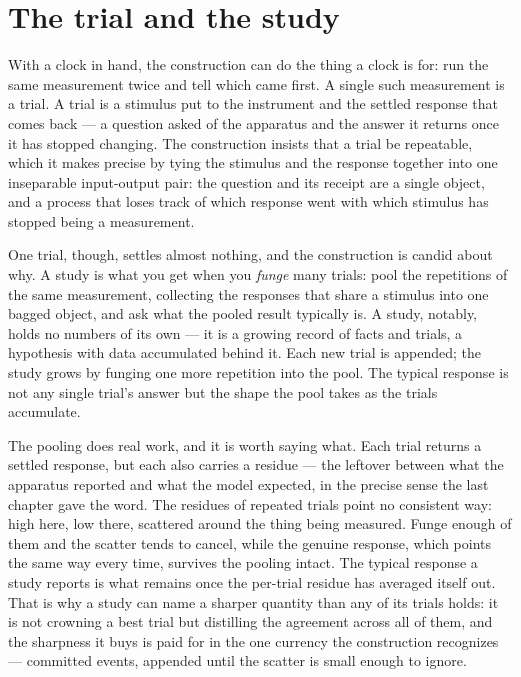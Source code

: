 \section{The trial and the study}
\label{se:the-trial-and-the-study}

With a clock in hand, the construction can do the thing a clock is for: run the same measurement twice
and tell which came first. A single such measurement is a trial. A trial is a stimulus put to the
instrument and the settled response that comes back --- a question asked of the apparatus and the
answer it returns once it has stopped changing. The construction insists that a trial be repeatable,
which it makes precise by tying the stimulus and the response together into one inseparable
input-output pair: the question and its receipt are a single object, and a process that loses track of
which response went with which stimulus has stopped being a measurement.

One trial, though, settles almost nothing, and the construction is candid about why. A study is what
you get when you \emph{funge} many trials: pool the repetitions of the same measurement, collecting
the responses that share a stimulus into one bagged object, and ask what the pooled result typically
is. A study, notably, holds no numbers of its own --- it is a growing record of facts and trials, a
hypothesis with data accumulated behind it. Each new trial is appended; the study grows by funging one
more repetition into the pool. The typical response is not any single trial's answer but the shape the
pool takes as the trials accumulate.

The pooling does real work, and it is worth saying what. Each trial returns a settled response, but
each also carries a residue --- the leftover between what the apparatus reported and what the model
expected, in the precise sense the last chapter gave the word. The residues of repeated trials point
no consistent way: high here, low there, scattered around the thing being measured. Funge enough of
them and the scatter tends to cancel, while the genuine response, which points the same way every
time, survives the pooling intact. The typical response a study reports is what remains once the
per-trial residue has averaged itself out. That is why a study can name a sharper quantity than any of
its trials holds: it is not crowning a best trial but distilling the agreement across all of them, and
the sharpness it buys is paid for in the one currency the construction recognizes --- committed
events, appended until the scatter is small enough to ignore.

